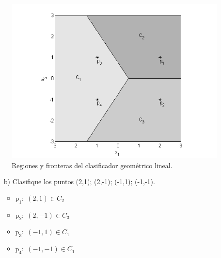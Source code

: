 \documentclass[11pt,a4paper,final]{article}
\begin{document}
\begin{figure}[h]
	\centering
	\includegraphics[width=.8\textwidth]{ejercicio21}
	\caption{Regiones y fronteras del clasificador geométrico lineal.}
	\label{ejercicio21}
\end{figure}

\begin{enumerate}
\item[b)] Clasifique los puntos (2,1); (2,-1); (-1,1); (-1,-1).
\begin{itemize}
\item $\mathrm{p_1}:\; (2,1) \in C_2$
\item $\mathrm{p_2}:\; (2,-1) \in C_3$
\item $\mathrm{p_3}:\; (-1,1) \in C_1$
\item $\mathrm{p_4}:\; (-1,-1) \in C_1$
\end{itemize}
\end{enumerate}
\end{document}

